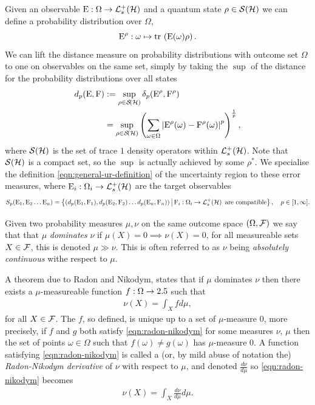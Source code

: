 Given an observable $\ope:\Omega\to\posops[\hcal]$ and a quantum state $\rho\in\dops[\hcal]$ we can define a probability distribution over $\Omega$,
\begin{equation}
  \ope^\rho:\omega \mapsto \tr{\ope(\omega)\rho}.
\end{equation}
We can lift the distance measure on probability distributions with outcome set $\Omega$ to one on observables on the same set, simply by taking the $\sup$ of the distance for the probability distributions over all states
\begin{align}
  d_p(\ope, \opf) &\defeq \sup_{\rho\in\dops[\hcal]} \delta_p(\ope^\rho, \opf^\rho)\\
                  &= \sup_{\rho\in\dops[\hcal]} \left(\sum_{\omega\in\Omega}\abs{\ope^\rho(\omega) - \opf^\rho(\omega)}^p\right)^{\frac{1}{p}},
\end{align}
where $\dops[\hcal]$ is the set of trace $1$ density operators within $\posops[\hcal]$. Note that $\dops[\hcal]$ is a compact set, so the $\sup$ is actually achieved by some $\rho^*$. We specialise the definition \eqref{eqn:general-ur-definition} of the uncertainty region to these error measures, where $\ope_i:\Omega_i\to\posops[\hcal]$ are the target observables
\begin{equation}
  S_p(\ope_1, \ope_2\hdots \ope_n) = \sbuild{(d_p(\ope_1, \opf_1), d_p(\ope_2, \opf_2)\hdots d_p(\ope_n, \opf_n))}{\opf_i:\Omega_i\to\posops[\hcal] \text{ are compatible}},\quad p\in [1,\infty].
\end{equation}

Given two probability measures $\mu,\nu$ on the same outcome space $(\Omega, \mathcal{F})$ we say that that $\mu$ \emph{dominates} $\nu$ if $\mu(X) = 0\implies\nu(X) = 0$, for all measureable sets $X\in\mathcal{F}$, this is denoted $\mu\gg\nu$. This is often referred to as $\nu$ being \emph{absolutely continuous} withe respect to $\mu$.

A theorem due to Radon and Nikodym, \cites{billingsley-prob-and-measure}{Nikodym1930} states that if $\mu$ dominates $\nu$ then there exists a $\mu$-measureable function $f:\Omega\to 2.5$ such that 
\begin{align}\label{eqn:radon-nikodym}
  \nu(X) = \int_X f d\mu,
\end{align}
for all $X\in\mathcal{F}$. The $f$, so defined, is unique up to a set of $\mu$-measure $0$, more precisely, if $f$ and $g$ both satisfy \eqref{eqn:radon-nikodym} for some measures $\nu$, $\mu$ then the set of points $\omega\in\Omega$ such that $f(\omega)\neq g(\omega)$ has $\mu$-measure $0$. A function satisfying \eqref{eqn:radon-nikodym} is called a (or, by mild abuse of notation the) \emph{Radon-Nikodym derivative} of $\nu$ with respect to $\mu$, and denoted $\frac{d\nu}{d\mu}$ so \eqref{eqn:radon-nikodym} becomes
\begin{align}\label{eqn:radon-nikodym-2}
  \nu(X) = \int_X \frac{d\nu}{d\mu} d\mu.
\end{align}

